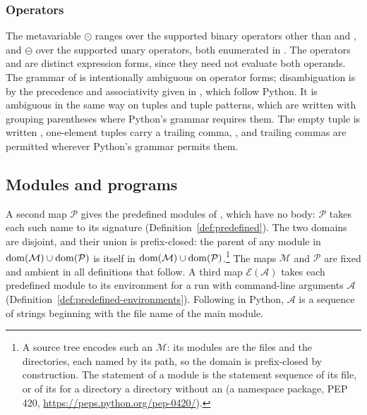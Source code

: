 \subsubsection{Operators}
\label{sec:syntax-operators}

The metavariable $\odot$ ranges over the supported binary operators other than  and
, and $\ominus$ over the supported unary
operators, both enumerated in . The operators  and  are distinct
expression forms, since they need not evaluate both operands. The grammar of  is intentionally ambiguous
on operator forms; disambiguation is by the precedence and associativity given in ,
which follow Python. It is ambiguous in the same way on tuples and tuple patterns, which are written with grouping parentheses where Python's grammar requires them. The empty tuple is written \pyinline{()}, one-element tuples carry a trailing comma, , and trailing commas are permitted wherever Python's grammar permits them.



\subsection{Modules and programs}
\label{sec:modules-programs}



A second map $\mathcal{P}$ gives the
predefined modules of , which have no body: $\mathcal{P}$ takes each such name to its
signature (Definition~\ref{def:predefined}). The two domains are disjoint, and their union is
prefix-closed: the parent of any module in $\mathrm{dom}(\mathcal{M}) \cup \mathrm{dom}(\mathcal{P})$ is itself in
$\mathrm{dom}(\mathcal{M}) \cup \mathrm{dom}(\mathcal{P})$.\footnote{A source tree encodes such an $\mathcal{M}$: its modules are the  files and the
directories, each named by its path, so the domain is prefix-closed by construction. The statement of a module is
the statement sequence of its  file, or of its  for a directory a directory without an  (a namespace package,
PEP 420, \url{https://peps.python.org/pep-0420/}).} The maps
$\mathcal{M}$ and $\mathcal{P}$ are fixed and ambient in all definitions that follow. A third map $\mathcal{E}(\mathcal{A})$ takes each predefined module to its environment for a run with command-line arguments $\mathcal{A}$ (Definition~\ref{def:predefined-environments}). Following  in Python, $\mathcal{A}$ is a sequence of strings beginning with the file name of the main module.

